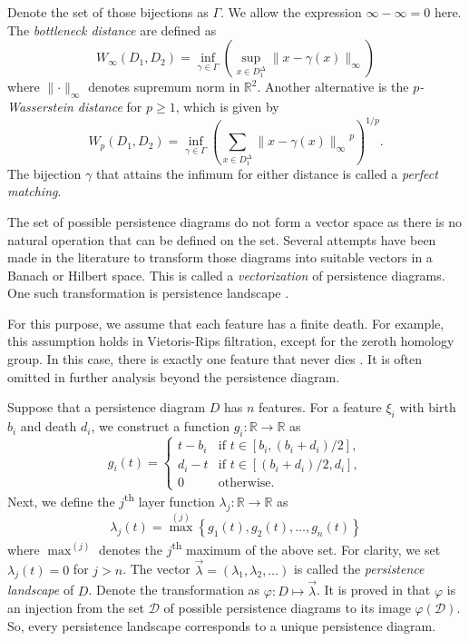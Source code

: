 \documentclass[sn-mathphys-num]{sn-jnl}%
\theoremstyle{thmstyleone}%
\theoremstyle{thmstyletwo}%
\theoremstyle{thmstylethree}%
\begin{document}
Denote the set of those bijections as $\Gamma$. We allow the expression $\infty-\infty=0$ here. The \emph{bottleneck distance} are defined as
\begin{equation*}
	W_{\infty}(D_1, D_2)=\inf _{\gamma \in \Gamma}\left(\sup _{x \in D_1^{\Delta}}\|x-\gamma(x)\|_{\infty}\right)
\end{equation*}
where $\lVert\cdot\rVert_{\infty}$ denotes supremum norm in $\mathbb{R}^2$. Another alternative is the \emph{$p$-Wasserstein distance} for $p \geq 1$, which is given by
\begin{equation*}
	W_p(D_1, D_2)=\inf _{\gamma \in \Gamma}\left(\sum_{x \in D_1^{\Delta}}{\|x-\gamma(x)\|_\infty}^p\right)^{1 / p}.
\end{equation*}
The bijection $\gamma$ that attains the infimum for either distance is called a \emph{perfect matching}.

The set of possible persistence diagrams do not form a vector space as there is no natural operation that can be defined on the set. Several attempts have been made in the literature to transform those diagrams into suitable vectors in a Banach or Hilbert space. This is called a \emph{vectorization} of persistence diagrams. One such transformation is persistence landscape \cite{Bubenik_1, Bubenik_2}.

For this purpose, we assume that each feature has a finite death. For example, this assumption holds in Vietoris-Rips filtration, except for the zeroth homology group. In this case, there is exactly one feature that never dies \cite{Hatcher}. It is often omitted in further analysis beyond the persistence diagram.

Suppose that a persistence diagram $D$ has $n$ features. For a feature $\xi_i$ with birth $b_i$ and death $d_i$, we construct a function $g_i: \mathbb{R} \rightarrow \mathbb{R}$ as
\begin{equation*}
	g_i(t)= 
	\begin{cases}
		t-b_i & \textrm{if } t \in\left[b_i,\left(b_i+d_i\right) / 2\right], \\ 
		d_i-t & \textrm{if } t \in\left[\left(b_i+d_i\right) / 2, d_i\right], \\ 
		0 & \textrm{otherwise}.
	\end{cases}
\end{equation*}
Next, we define the $j$\textsuperscript{th} layer function $\lambda_j: \mathbb{R} \rightarrow \mathbb{R}$ as
\begin{equation*}
	\lambda_j(t)={\max}^{(j)}\left\{g_1(t), g_2(t), \hdots, g_n(t)\right\}
\end{equation*}
where ${\max}^{(j)}$ denotes the $j$\textsuperscript{th} maximum of the above set. For clarity, we set $\lambda_j(t)=0$ for $j>n$. The vector $\vec{\lambda}=\left(\lambda_1, \lambda_2, \hdots\right)$ is called the \emph{persistence landscape} of $D$. Denote the transformation as $\varphi: D \mapsto \vec{\lambda}$. It is proved in \cite{Betthauser-Bubenik-Edwards} that $\varphi$ is an injection from the set $\mathcal{D}$ of possible persistence diagrams to its image $\varphi(\mathcal{D})$. So, every persistence landscape corresponds to a unique persistence diagram.
\end{document}
